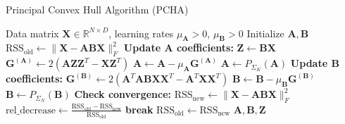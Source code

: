 \documentclass[oneside]{article}
\begin{document}
\begin{algorithm}
\caption{Principal Convex Hull Algorithm (PCHA)}
\label{alg:pcha}
\begin{algorithmic}[1]
\Require Data matrix $\mathbf{X} \in \mathbb{R}^{N \times D}$, learning rates $\mu_{\mathbf{A}} > 0$, $\mu_{\mathbf{B}} > 0$
\State Initialize $\mathbf{A}, \mathbf{B}$
\State $\text{RSS}_{\text{old}} \gets \| \mathbf{X} - \mathbf{A} \mathbf{B} \mathbf{X} \|_F^2$
    \Statex \hspace{-\algorithmicindent} \textbf{Update A coefficients:}
    \State $\mathbf{Z} \gets \mathbf{B} \mathbf{X}$ 
    \State $\mathbf{G}^{(\mathbf{A})} \gets 2(\mathbf{A} \mathbf{Z} \mathbf{Z}^T - \mathbf{X} \mathbf{Z}^T)$ 
    \State $\mathbf{A} \gets \mathbf{A} - \mu_{\mathbf{A}} \mathbf{G}^{(\mathbf{A})}$ 
    \State $\mathbf{A} \gets P_{\Sigma_K}(\mathbf{A})$ 
    \Statex \hspace{-\algorithmicindent} \textbf{Update B coefficients:}
    \State $\mathbf{G}^{(\mathbf{B})} \gets 2(\mathbf{A}^T \mathbf{A} \mathbf{B} \mathbf{X} \mathbf{X}^T - \mathbf{A}^T \mathbf{X} \mathbf{X}^T)$ 
    \State $\mathbf{B} \gets \mathbf{B} - \mu_{\mathbf{B}} \mathbf{G}^{(\mathbf{B})}$ 
    \State $\mathbf{B} \gets P_{\Sigma_N}(\mathbf{B})$ 
    \Statex \hspace{-\algorithmicindent} \textbf{Check convergence:}
    \State $\text{RSS}_{\text{new}} \gets \| \mathbf{X} - \mathbf{A} \mathbf{B} \mathbf{X} \|_F^2$
    \State $\text{rel\_decrease} \gets \frac{\text{RSS}_{\text{old}} - \text{RSS}_{\text{new}}}{\text{RSS}_{\text{old}}}$ 
        \State \textbf{break} 
    \EndIf
    \State $\text{RSS}_{\text{old}} \gets \text{RSS}_{\text{new}}$
\EndWhile
\State \Return $\mathbf{A}, \mathbf{B}, \mathbf{Z}$
\end{algorithmic}
\end{algorithm}
\end{document}
